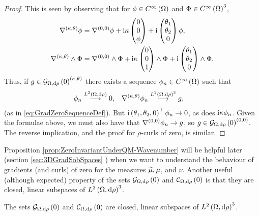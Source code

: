 \begin{proof}
	This is seen by observing that for $\phi\in C^{\infty}\left( \Omega \right)$ and $\Phi\in C^{\infty}\left( \Omega \right)^3$,
	\begin{align*}
		\nabla^{\left( \kappa, \theta \right)}\phi &= \nabla^{\left( 0, 0 \right)}\phi + \mathrm{i}\kappa\begin{pmatrix} 0 \\ 0 \\ \phi \end{pmatrix} + \mathrm{i}\begin{pmatrix} \theta_1 \\ \theta_2 \\ 0 \end{pmatrix}\phi, \\
		\nabla^{\left( \kappa, \theta \right)}\wedge\Phi &= \nabla^{\left( 0, 0 \right)}\wedge\Phi + \mathrm{i}\kappa\begin{pmatrix} 0 \\ 0 \\ 1 \end{pmatrix}\wedge\Phi + \mathrm{i}\begin{pmatrix} \theta_1 \\ \theta_2 \\ 0 \end{pmatrix} \wedge \Phi.
	\end{align*}
	Thus, if $g\in \mathcal{G}_{ \Omega, \mathrm{d}\rho}\left( 0 \right)^{\left( \kappa, \theta \right)}$ there exists a sequence $\phi_n\in C^{\infty}\left( \Omega \right)$ such that
	\begin{align*}
		\phi_n \overset{L^{2}\left( \Omega,\mathrm{d}\rho \right)}{\longrightarrow} 0, &\quad \nabla^{\left( \kappa, \theta \right)}\phi_n \overset{ L^{2}\left( \Omega,\mathrm{d}\rho \right)^3 }{\longrightarrow} g,
	\end{align*}
	(as in \eqref{eq:GradZeroSequenceDef}).
	But $\mathrm{i}\left( \theta_1, \theta_2, 0 \right)^{\top}\phi_n\rightarrow 0$, as does $\mathrm{i}\kappa\phi_n$.
	Given the formulae above, we must also have that $\nabla^{\left( 0, 0 \right)}\phi_n\rightarrow g$, so $g\in \mathcal{G}_{ \Omega, \mathrm{d}\rho}\left( 0 \right)^{\left( 0, 0 \right)}$.
	The reverse implication, and the proof for $\rho$-curls of zero, is similar.
\end{proof}
Proposition \ref{prop:ZeroInvariantUnderQM-Wavenumber} will be helpful later (section \ref{sec:3DGradSobSpaces} ) when we want to understand the behaviour of gradients (and curls) of zero for the measures $\widetilde{\mu}, \mu$, and $\nu$.
Another useful (although expected) property of the sets $\mathcal{G}_{ \Omega, \mathrm{d}\rho}\left( 0 \right)$ and $\mathcal{C}_{ \Omega, \mathrm{d}\rho}\left( 0 \right)$ is that they are closed, linear subspaces of $L^{2}\left( \Omega,\mathrm{d}\rho \right)^3$.
\begin{prop}
	The sets $\mathcal{G}_{ \Omega, \mathrm{d}\rho}\left( 0 \right)$ and $\mathcal{C}_{ \Omega, \mathrm{d}\rho}\left( 0 \right)$ are closed, linear subspaces of $L^{2}\left( \Omega,\mathrm{d}\rho \right)^3$.
\end{prop}
